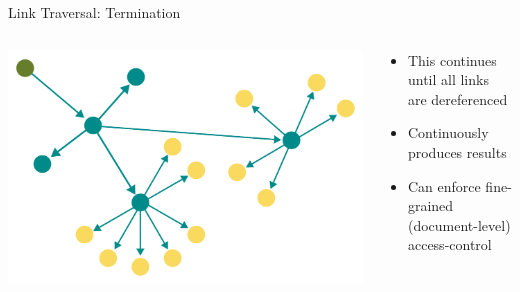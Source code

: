 \begin{frame}{Link Traversal: Termination}
    \begin{columns}[T] %
        \begin{column}{0.6\textwidth} %
            \includegraphics[width=\linewidth]{images/showing-link-traversal-step-3.pdf} %
        \end{column}

        \begin{column}{0.4\textwidth} %
            \begin{itemize}
                \item This continues until all links are dereferenced
                \item Continuously produces results
                \item Can enforce fine-grained (document-level) access-control
            \end{itemize}
        \end{column}
    \end{columns}
\end{frame}